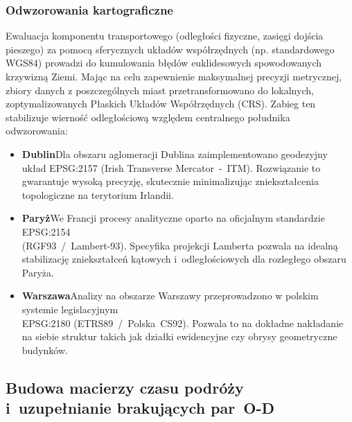 \documentclass{pracamgr}
\begin{document}
\subsubsection{Odwzorowania kartograficzne}

Ewaluacja komponentu transportowego (odległości fizyczne, zasięgi dojścia pieszego) za pomocą sferycznych układów współrzędnych (np. standardowego WGS84) prowadzi do kumulowania błędów euklidesowych spowodowanych krzywizną Ziemi. Mając na celu zapewnienie maksymalnej precyzji metrycznej, zbiory danych z poszczególnych miast przetransformowano do lokalnych, zoptymalizowanych Płaskich Układów Współrzędnych (CRS). Zabieg ten stabilizuje wierność odległościową względem centralnego południka odwzorowania:

\begin{itemize}
\item[]\textbf{Dublin}\newline Dla obszaru aglomeracji Dublina zaimplementowano geodezyjny układ \mbox{EPSG:2157} (Irish Transverse Mercator~-~ITM). Rozwiązanie to gwarantuje wysoką precyzję, skutecznie minimalizując zniekształcenia topologiczne na terytorium Irlandii.
\item[]\textbf{Paryż}\newline We Francji procesy analityczne oparto na oficjalnym standardzie \mbox{EPSG:2154} \\ (\mbox{RGF93~/~Lambert-93}). Specyfika projekcji Lamberta pozwala na idealną stabilizację zniekształceń kątowych i~odległościowych dla rozległego obszaru Paryża.
\item[]\textbf{Warszawa}\newline Analizy na obszarze Warszawy przeprowadzono w polskim systemie legislacyjnym \\ \mbox{EPSG:2180} \mbox{(ETRS89 / Polska CS92)}. Pozwala to na dokładne nakładanie na siebie struktur takich jak działki ewidencyjne czy obrysy geometryczne budynków.
\end{itemize}

\subsection{Budowa macierzy czasu podróży i~uzupełnianie brakujących par~\mbox{O-D}}
\end{document}
